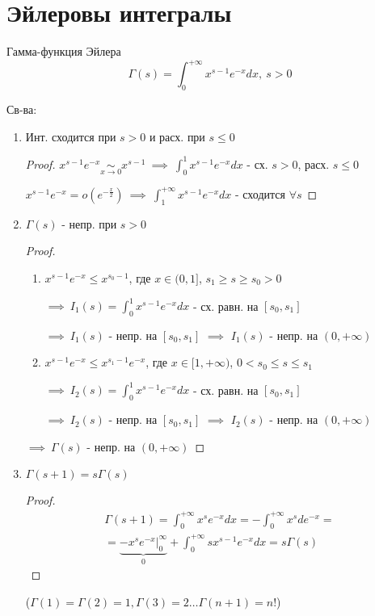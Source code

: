 \documentclass{article}
\begin{document}
\section{Эйлеровы интегралы}
\begin{definition}
  Гамма-функция Эйлера
  \[
    \Gamma(s)=\int_{0}^{+\infty}x^{s-1}e^{-x}dx, \ s>0
  \]
\end{definition}
Св-ва:
\begin{enumerate}
  \item Инт. сходится при $s>0$ и расх. при $s\le0$

    \begin{proof}
      \phantom{.}

      $x^{s-1}e^{-x} \underset{x\to 0}{\sim}x^{s-1} \ \implies \ \int_{0}^{1}x^{s-1}e^{-x}dx$ - сх. $s>0$, расх. $s\le0$

    $x^{s-1}e^{-x}=o(e^{-\frac{x}{2}}) \ \implies \ \int_{1}^{+\infty}x^{s-1}e^{-x}dx$ - сходится $\forall s$
    \end{proof}
  \item $\Gamma(s)$ - непр. при $s>0$

    \begin{proof}
      \phantom{.}

      \begin{enumerate}
        \item $x^{s-1}e^{-x}\le x ^{s_0-1}$, где $x\in (0,1]$, $s_1\ge s \ge s_0> 0$

          $\implies \ I_1(s)=\int_{0}^{1}x^{s-1}e^{-x}dx$ - сх. равн. на $[s_0,s_1]$

          $\implies \ I_1(s)$ - непр. на $[s_0,s_1]$ $\implies$ $I_1(s)$ - непр. на $(0,+\infty)$
        \item $x^{s-1}e^{-x}\le x^{s_1-1}e^{-x}$, где $x\in[1,+\infty)$, $0<s_0\le s \le s_1$

          $\implies \ I_2(s)=\int_{0}^{1}x^{s-1}e^{-x}dx$ - сх. равн. на $[s_0,s_1]$

          $\implies \ I_2(s)$ - непр. на $[s_0,s_1]$ $\implies$ $I_2(s)$ - непр. на $(0,+\infty)$
      \end{enumerate}
      $\implies \ \Gamma(s)$ - непр. на $(0,+\infty)$
    \end{proof}
  \item $\Gamma(s+1)=s\Gamma(s)$
    \begin{proof}
      \begin{gather*}
        \Gamma(s+1)=\int_{0}^{+\infty}x^{s}e^{-x}dx= -\int_{0}^{+\infty}x^{s}de^{-x} = \\
        =\underbrace{-x^{s}e^{-x}\big|_{0}^{\infty}}_{0}+\int_{0}^{+\infty}sx^{s-1}e^{-x}dx=s\Gamma(s)
      \end{gather*}
    \end{proof}
    ($\Gamma(1)=\Gamma(2)=1, \Gamma(3)=2\dots \Gamma(n+1)=n!$)
\end{enumerate}
\end{document}
